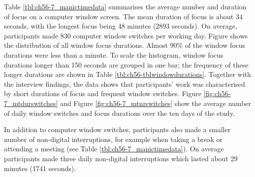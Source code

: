 Table \ref{tbl:ch56-7_manictimedata} summarises the average number and duration of focus on a computer window screen. The mean duration of focus is about 34 seconds, with the longest focus being 48 minutes (2893 seconds). On average, participants made 830 computer window switches per working day. Figure shows the distribution of all window focus durations. Almost 90\% of the window focus durations were less than a minute. To scale the histogram, window focus durations longer than 150 seconds are grouped in one bar; the frequency of these longer durations are shown in Table \ref{tbl:ch56-tblwindowdurations}. %
Together with the interview findings, the data shows that participants’ work was characterised by short durations of focus and frequent window switches. Figure \ref{fig:ch56-7_mtdurswitches} and Figure \ref{fig:ch56-7_mtnrswitches} show the average number of daily window switches and focus durations over the ten days of the study.

In addition to computer window switches, participants also made a smaller number of non-digital interruptions, for example when taking a break or attending a meeting (see Table \ref{tbl:ch56-7_manictimedata}). On average participants made three daily non-digital interruptions which lasted about 29 minutes (1741 seconds). 

